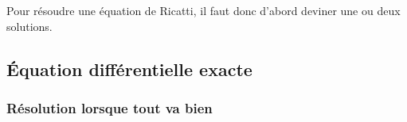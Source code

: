 Pour résoudre une équation de Ricatti, il faut donc d'abord deviner une ou deux solutions.

					\subsection{Équation différentielle exacte}
\label{SubSecEqDiffExacte}

					\subsubsection{Résolution lorsque tout va bien}

